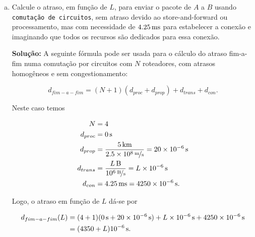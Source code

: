 \documentclass{article}
\begin{document}
\begin{enumerate}
\begin{enumerate}[a)]
\begin{addmargin}[0.5in]{0.5in}
Logo, o atraso em função de $L$ dá-se por

\begin{equation} \label{eq2}
\begin{split}
d_{fim-a-fim}(L) & = (4 + 1)(\unit[10 \times 10^{-6}]{s} + \unit[20 \times 10^{-6}]{s} + \unit[L \times 10^{-6}]{s}) \\
& = \unit[(30 + L)(5 \times 10^{-6})]{s}.
\end{split}
\end{equation}

\end{addmargin}

\item Calcule o atraso, em função de $L$, para enviar o pacote de $A$ a $B$ usando \texttt{comutação de circuitos}, sem atraso devido ao store-and-forward ou processamento, mas com necessidade de $\unit[4.25]{ms}$ para estabelecer a conexão e imaginando que todos os recursos são dedicados para essa conexão.

\begin{addmargin}[0.5in]{0.5in}
\par \textbf{Solução:} A seguinte fórmula pode ser usada para o cálculo do atraso fim-a-fim numa comutação por circuitos com $N$ roteadores, com atrasos homogêneos e sem congestionamento:

$$d_{fim-a-fim} = (N + 1)(d_{proc} + d_{prop}) + d_{trans} + d_{con}.$$

Neste caso temos

\begin{equation} \label{eq1}
\begin{split}
N & = 4 \\
d_{proc} & = \unit[0]{s}\\
d_{prop} & = \frac{\unit[5]{km}}{\unitfrac[2.5 \times 10^8]{m}{s}} = \unit[20 \times 10^{-6}]{s}\\
d_{trans} & = \frac{\unit[L]{B}}{\unitfrac[10^6]{B}{s}} = \unit[L \times 10^{-6}]{s}\\
d_{con} & = \unit[4.25]{ms} = \unit[4250 \times 10^{-6}]{s}.
\end{split}
\end{equation}

Logo, o atraso em função de $L$ dá-se por

\begin{equation} \label{eq2}
\begin{split}
d_{fim-a-fim}(L) & = (4 + 1)(\unit[0]{s} + \unit[20 \times 10^{-6}]{s}) + \unit[L \times 10^{-6}]{s} + \unit[4250 \times 10^{-6}]{s}\\
& = \unit[(4350 + L) 10^{-6}]{s}.
\end{split}
\end{equation}


\end{addmargin}
\end{enumerate}
\end{enumerate}
\end{document}
